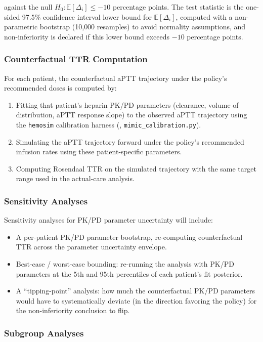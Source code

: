 \documentclass[11pt]{article}
\begin{document}
against the null $H_0: \mathbb{E}[\Delta_i] \leq -10$ percentage points. The test statistic is the one-sided 97.5\% confidence interval lower bound for $\mathbb{E}[\Delta_i]$, computed with a non-parametric bootstrap (10{,}000 resamples) to avoid normality assumptions, and non-inferiority is declared if this lower bound exceeds $-10$ percentage points.

\subsubsection{Counterfactual TTR Computation}

For each patient, the counterfactual aPTT trajectory under the policy's recommended doses is computed by:
\begin{enumerate}
  \item Fitting that patient's heparin PK/PD parameters (clearance, volume of distribution, aPTT response slope) to the observed aPTT trajectory using the \texttt{hemosim} calibration harness (\citep{hemosim2026}, \texttt{mimic\_calibration.py}).
  \item Simulating the aPTT trajectory forward under the policy's recommended infusion rates using these patient-specific parameters.
  \item Computing Rosendaal TTR on the simulated trajectory with the same target range used in the actual-care analysis.
\end{enumerate}

\subsubsection{Sensitivity Analyses}

Sensitivity analyses for PK/PD parameter uncertainty will include:
\begin{itemize}
  \item A per-patient PK/PD parameter bootstrap, re-computing counterfactual TTR across the parameter uncertainty envelope.
  \item Best-case / worst-case bounding: re-running the analysis with PK/PD parameters at the 5th and 95th percentiles of each patient's fit posterior.
  \item A ``tipping-point'' analysis: how much the counterfactual PK/PD parameters would have to systematically deviate (in the direction favoring the policy) for the non-inferiority conclusion to flip.
\end{itemize}

\subsubsection{Subgroup Analyses}
\end{document}
